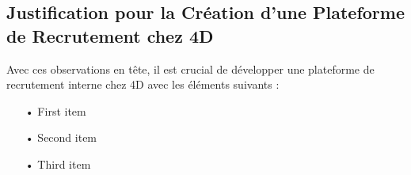 \subsection{Justification pour la Création d'une Plateforme de Recrutement chez 4D}
Avec ces observations en tête, il est crucial de développer une plateforme 
de recrutement interne chez 4D avec les éléments suivants :

\begin{itemize}
   \item[ • ] First item
   \item[ • ] Second item
   \item[ • ] Third item
\end{itemize}
